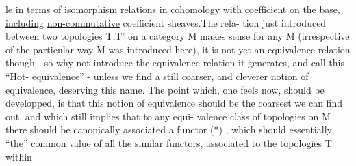 le in terms of isomorphism relations in cohomology with  coefficient 
on the base,  \uline{including} \uline{non-commutative} coefficient sheaves.The rela-%
tion just introduced between two topologies T,T' on a category M makes
sense for any M  (irrespective of the particular way M was introduced
here),  it is not yet an equivalence relation though  -  so why not
introduce the equivalence relation it generates,  and call this ``Hot-%
equivalence'' -  unless we find a still coarser,  and cleverer notion
of equivalence,  deserving this name.  The point which,  one feels now,
should be developped,  is that this notion of equivalence should be
the coarsest we can find out,  and which still implies that to any equi-%
valence class of topologies on M there should be canonically associated
a functor  (*) ,  which should essentially  ``the'' common value of
all the similar functors,  associated to the topologies T within 
